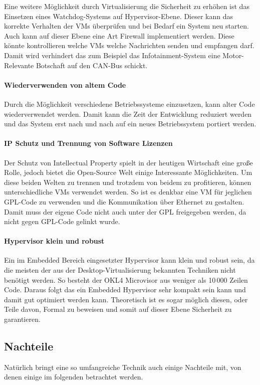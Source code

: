 \documentclass[
  a4paper,					    %
  twoside,
  DIV=calc,     				%
  bibliography=totoc,
  cleardoublepage=empty,
  ngerman,     					%
  final       					%
]{scrbook}
\begin{document}
Eine weitere Möglichkeit durch Virtualisierung die Sicherheit zu erhöhen ist das Einsetzen eines Watchdog-Systems auf Hypervisor-Ebene. Dieser kann das korrekte Verhalten der VMs überprüfen und bei Bedarf ein System neu starten. Auch kann auf dieser Ebene eine Art Firewall implementiert werden. Diese könnte kontrollieren welche VMs welche Nachrichten senden und empfangen darf. Damit wird verhindert das zum Beispiel das Infotainment-System eine Motor-Relevante Botschaft auf den CAN-Bus schickt.

\paragraph{Wiederverwenden von altem Code}
Durch die Möglichkeit verschiedene Betriebssysteme einzusetzen, kann alter Code wiederverwendet werden. Damit kann die Zeit der Entwicklung reduziert werden und das System erst nach und nach auf ein neues Betriebssystem portiert werden.

\paragraph{IP Schutz und Trennung von Software Lizenzen}
Der Schutz von Intellectual Property spielt in der heutigen Wirtschaft eine große Rolle, jedoch bietet die Open-Source Welt einige Interessante Möglichkeiten. Um diese beiden Welten zu trennen und trotzdem von beidem zu profitieren, können unterschiedliche VMs verwendet werden. So ist es denkbar eine VM für jeglichen GPL-Code zu verwenden und die Kommunikation über Ethernet zu gestalten. Damit muss der eigene Code nicht auch unter der GPL freigegeben werden, da nicht gegen GPL-Code gelinkt wurde.

\paragraph{Hypervisor klein und robust}
Ein im Embedded Bereich eingesetzter Hypervisor kann klein und robust sein, da die meisten der aus der Desktop-Virtualisierung bekannten Techniken nicht benötigt werden. So besteht der OKL4 Microvisor aus weniger als 10\,000 Zeilen Code.\cite{okl4} Daraus folgt das ein Embedded Hypervisor sehr kompakt sein kann und damit gut optimiert werden kann. Theoretisch ist es sogar möglich diesen, oder Teile davon, Formal zu beweisen und somit auf dieser Ebene Sicherheit zu garantieren.

\subsection{Nachteile}
Natürlich bringt eine so umfangreiche Technik auch einige Nachteile mit, von denen einige im folgenden betrachtet werden.
\end{document}
